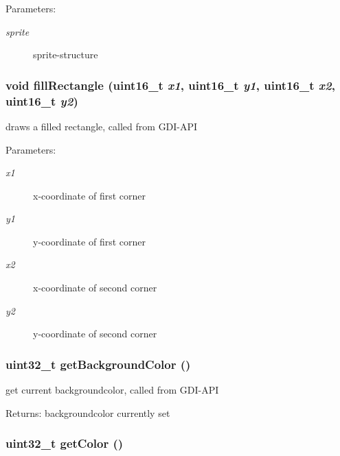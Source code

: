\begin{Desc}
\item[Parameters:]
\begin{description}
\item[{\em sprite}]sprite-structure \end{description}
\end{Desc}
\hypertarget{group__graphic__device_g777ea1e70848dcacfa26275e00527aae}{
\subsubsection[{fillRectangle}]{\setlength{\rightskip}{0pt plus 5cm}void fillRectangle (uint16\_\-t {\em x1}, \/  uint16\_\-t {\em y1}, \/  uint16\_\-t {\em x2}, \/  uint16\_\-t {\em y2})}}
\label{group__graphic__device_g777ea1e70848dcacfa26275e00527aae}


draws a filled rectangle, called from GDI-API 

\begin{Desc}
\item[Parameters:]
\begin{description}
\item[{\em x1}]x-coordinate of first corner \item[{\em y1}]y-coordinate of first corner \item[{\em x2}]x-coordinate of second corner \item[{\em y2}]y-coordinate of second corner \end{description}
\end{Desc}
\hypertarget{group__graphic__device_g81bda3c8db3821062fba08e5ecb2d90d}{
\subsubsection[{getBackgroundColor}]{\setlength{\rightskip}{0pt plus 5cm}uint32\_\-t getBackgroundColor ()}}
\label{group__graphic__device_g81bda3c8db3821062fba08e5ecb2d90d}


get current backgroundcolor, called from GDI-API 

\begin{Desc}
\item[Returns:]backgroundcolor currently set \end{Desc}
\hypertarget{group__graphic__device_ga7f56f8fafb90e55a6af7ac7646df124}{
\subsubsection[{getColor}]{\setlength{\rightskip}{0pt plus 5cm}uint32\_\-t getColor ()}}
\label{group__graphic__device_ga7f56f8fafb90e55a6af7ac7646df124}


